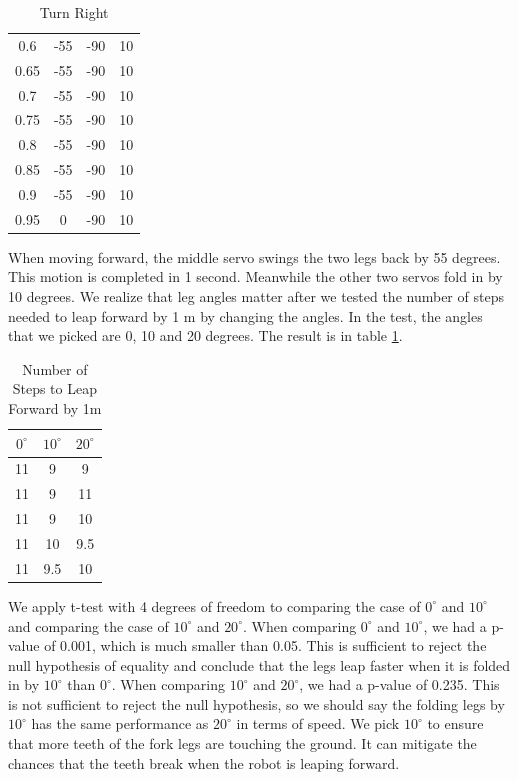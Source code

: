 \documentclass[a4paper, 12pt, oneside]{article} %
\begin{document}
\begin{itemize}
\begin{table}[htbp]
\begin{minipage}{0.33\textwidth}
\begin{tabular}{cccc}
					0.6&-55&-90&10\\
					0.65&-55&-90&10\\
					0.7&-55&-90&10\\
					0.75&-55&-90&10\\
					0.8&-55&-90&10\\
					0.85&-55&-90&10\\
					0.9&-55&-90&10\\
					0.95&0&-90&10\\
					\hline
				\end{tabular}
				\caption{Turn Right}
			\end{minipage}
		\end{table}
	
		When moving forward, the middle servo swings the two legs back by 55 degrees. This motion is completed in 1 second. Meanwhile the other two servos fold in by 10 degrees. We realize that leg angles matter after we tested the number of steps needed to leap forward by 1 m by changing the angles. In the test, the angles that we picked are 0, 10 and 20 degrees. The result is in table \ref{ttest}.
		\begin{table}[htbp]
			\centering
			\begin{tabular}{ccc}
				\toprule
				$0^{\circ}$&$10^{\circ}$&$20^{\circ}$\\
				\midrule
				11&	9&	9\\
				11&	9&	11\\
				11&	9&	10\\
				11&	10&	9.5\\
				11&	9.5&10\\
				\bottomrule
			\end{tabular}
		\caption{Number of Steps to Leap Forward by 1m}\label{ttest}
		\end{table}
	  
		We apply t-test with 4 degrees of freedom to comparing the case of $0^{\circ}$ and $10^{\circ}$ and comparing the case of $10^{\circ}$ and $20^{\circ}$. When comparing $0^{\circ}$ and $10^{\circ}$, we had a p-value of 0.001, which is much smaller than 0.05. This is sufficient to reject the null hypothesis of equality and conclude that the legs leap faster when it is folded in by $10^{\circ}$ than $0^{\circ}$. When comparing $10^{\circ}$ and $20^{\circ}$, we had a p-value of 0.235. This is not sufficient to reject the null hypothesis, so we should say the folding legs by $10^{\circ}$ has the same performance as $20^{\circ}$ in terms of speed. We pick $10^{\circ}$ to ensure that more teeth of the fork legs are touching the ground. It can mitigate the chances that the teeth break when the robot is leaping forward.
		

\end{itemize}
\end{document}
